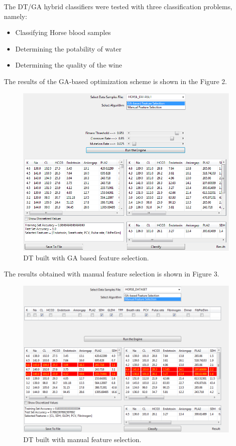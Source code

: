 \documentclass[conference]{IEEEtran}
\begin{document}
The DT/GA hybrid classifiers were tested with three classification problems, namely:
\begin{itemize}
\item{Classifying Horse blood samples}
\item{Determining the potability of water}
\item{Determining the quality of the wine}
\end{itemize}

The results of the GA-based optimization scheme is shown in the Figure 2.
\begin{figure}[h!]
  
  \centering
    \includegraphics[scale=0.4]{ga_algo_stats.png}
\caption{DT built with GA based feature selection.}
\end{figure}

The results obtained with manual feature selection is shown in Figure 3.
\begin{figure}[h!]
  
  \centering
    \includegraphics[scale=0.3]{manual_sel_stats.png}
\caption{DT built with manual feature selection.}
\end{figure}
\end{document}
